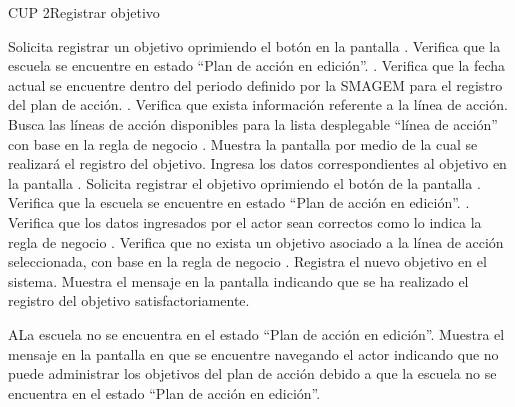 \begin{UseCase}{CUP 2}{Registrar objetivo}

\end{UseCase}
 
 
\begin{UCtrayectoria}
	\UCpaso[\UCactor] Solicita registrar un objetivo oprimiendo el botón  en la pantalla .
	\UCpaso[\UCsist] Verifica que la escuela se encuentre en  estado ``Plan de acción en edición''. .
    \UCpaso[\UCsist] Verifica que la fecha actual se encuentre dentro del periodo definido por la SMAGEM para el registro del plan de acción. .
	\UCpaso[\UCsist] Verifica que exista información referente a la línea de acción. 
	\UCpaso[\UCsist] Busca las líneas de acción disponibles para la lista desplegable ``línea de acción'' con base en la regla de negocio .
	\UCpaso[\UCsist] Muestra la pantalla  por medio de la cual se realizará el registro del objetivo.
	\UCpaso[\UCactor] Ingresa los datos correspondientes al objetivo en la pantalla . \label{cup2:ingresaDatos}
	\UCpaso[\UCactor] Solicita registrar el objetivo oprimiendo el botón  de la pantalla . 
	\UCpaso[\UCsist] Verifica que la escuela se encuentre en  estado ``Plan de acción en edición''. .
	\UCpaso[\UCsist] Verifica que los datos ingresados por el actor sean correctos como lo indica la regla de negocio .  
	\UCpaso[\UCsist] Verifica que no exista un objetivo asociado a la línea de acción seleccionada, con base en la regla de negocio .  %
	\UCpaso[\UCsist] Registra el nuevo objetivo en el sistema.
	\UCpaso[\UCsist] Muestra el mensaje  en la pantalla  indicando que se ha realizado el registro del objetivo satisfactoriamente.
\end{UCtrayectoria}
   \begin{UCtrayectoriaA}{A}{La escuela no se encuentra en el estado ``Plan de acción en edición''.}
    \UCpaso[\UCsist] Muestra el mensaje  en la pantalla en que se encuentre navegando el actor indicando que no puede administrar los objetivos del plan de acción debido a que la escuela no se encuentra en el estado ``Plan de acción en edición''. 
 \end{UCtrayectoriaA}
 
